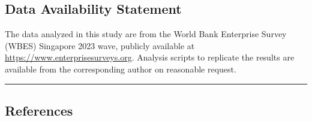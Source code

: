 \documentclass[12pt,a4paper]{article}
\begin{document}
\hypertarget{data-availability-statement}{%
\subsection{Data Availability
Statement}\label{data-availability-statement}}

The data analyzed in this study are from the World Bank Enterprise
Survey (WBES) Singapore 2023 wave, publicly available at
\url{https://www.enterprisesurveys.org}. Analysis scripts to replicate
the results are available from the corresponding author on reasonable
request.

\begin{center}\rule{0.5\linewidth}{0.5pt}\end{center}

\hypertarget{references}{%
\subsection{References}\label{references}}
\end{document}
